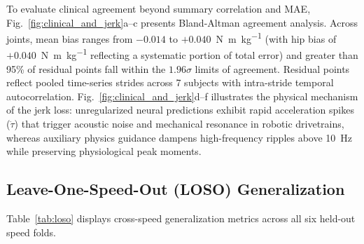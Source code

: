 \documentclass[journal]{IEEEtran}
\newcommand{\Nmskg}{\si{\newton\metre\per\kilogram}}
\begin{document}
To evaluate clinical agreement beyond summary correlation and MAE, Fig.~\ref{fig:clinical_and_jerk}a--c presents Bland-Altman agreement analysis. Across joints, mean bias ranges from $-0.014$ to $+0.040$~\Nmskg{} (with hip bias of $+0.040$~\Nmskg{} reflecting a systematic portion of total error) and greater than 95\% of residual points fall within the $1.96\sigma$ limits of agreement. Residual points reflect pooled time-series strides across 7 subjects with intra-stride temporal autocorrelation. Fig.~\ref{fig:clinical_and_jerk}d--f illustrates the physical mechanism of the jerk loss: unregularized neural predictions exhibit rapid acceleration spikes ($\ddot{\tau}$) that trigger acoustic noise and mechanical resonance in robotic drivetrains, whereas auxiliary physics guidance dampens high-frequency ripples above 10~Hz while preserving physiological peak moments.

\subsection{Leave-One-Speed-Out (LOSO) Generalization}
Table~\ref{tab:loso} displays cross-speed generalization metrics across all six held-out speed folds.
\end{document}
